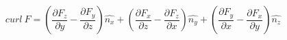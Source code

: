 \begin{equation}
	curl\ F=\left(\frac{\partial F_z}{\partial y}
	-\frac{\partial F_y}{\partial z}\right)\hat{n_x}
	+\left(\frac{\partial F_x}{\partial z}
	-\frac{\partial F_z}{\partial x}\right)\hat{n_y}
	+\left(\frac{\partial F_y}{\partial x}
	-\frac{\partial F_x}{\partial y}\right)\hat{n_z}
\end{equation}
